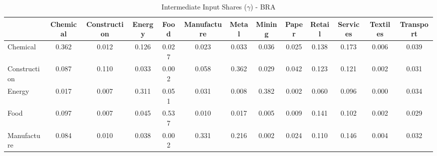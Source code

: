 \begin{table}[htbp]
\centering
\caption{Intermediate Input Shares ($\gamma$) - BRA} 
\label{tab:gamma_BRA}
\begin{tabular}{lcccccccccccc}
  \hline
 & Chemical & Construction & Energy & Food & Manufacture & Metal & Mining & Paper & Retail & Services & Textiles & Transport \\ 
  \hline
Chemical & \textcolor[RGB]{11,7,244}{0.362} & \textcolor[RGB]{189,123,66}{0.012} & \textcolor[RGB]{42,27,212}{0.126} & \textcolor[RGB]{161,104,94}{0.027} & \textcolor[RGB]{172,111,83}{0.023} & \textcolor[RGB]{147,95,108}{0.033} & \textcolor[RGB]{138,89,117}{0.036} & \textcolor[RGB]{165,107,90}{0.025} & \textcolor[RGB]{37,24,218}{0.138} & \textcolor[RGB]{25,16,230}{0.173} & \textcolor[RGB]{221,143,34}{0.006} & \textcolor[RGB]{131,85,124}{0.039} \\ 
  Construction & \textcolor[RGB]{87,56,168}{0.087} & \textcolor[RGB]{57,37,198}{0.110} & \textcolor[RGB]{149,96,106}{0.033} & \textcolor[RGB]{237,154,18}{0.002} & \textcolor[RGB]{113,73,142}{0.058} & \textcolor[RGB]{12,8,243}{0.362} & \textcolor[RGB]{158,102,97}{0.029} & \textcolor[RGB]{128,82,128}{0.042} & \textcolor[RGB]{46,30,209}{0.123} & \textcolor[RGB]{50,32,205}{0.121} & \textcolor[RGB]{241,156,14}{0.002} & \textcolor[RGB]{154,100,101}{0.031} \\ 
  Energy & \textcolor[RGB]{179,116,76}{0.017} & \textcolor[RGB]{204,132,51}{0.007} & \textcolor[RGB]{18,11,237}{0.311} & \textcolor[RGB]{120,78,135}{0.051} & \textcolor[RGB]{152,99,103}{0.031} & \textcolor[RGB]{202,131,53}{0.008} & \textcolor[RGB]{9,6,246}{0.382} & \textcolor[RGB]{243,157,12}{0.002} & \textcolor[RGB]{110,71,145}{0.060} & \textcolor[RGB]{80,52,175}{0.096} & \textcolor[RGB]{253,164,2}{0.000} & \textcolor[RGB]{140,91,115}{0.034} \\ 
  Food & \textcolor[RGB]{78,50,177}{0.097} & \textcolor[RGB]{211,136,44}{0.007} & \textcolor[RGB]{122,79,133}{0.045} & \textcolor[RGB]{0,0,255}{0.537} & \textcolor[RGB]{197,127,58}{0.010} & \textcolor[RGB]{177,115,78}{0.017} & \textcolor[RGB]{223,144,32}{0.005} & \textcolor[RGB]{198,128,57}{0.009} & \textcolor[RGB]{35,23,220}{0.141} & \textcolor[RGB]{71,46,184}{0.102} & \textcolor[RGB]{234,151,21}{0.002} & \textcolor[RGB]{156,101,99}{0.029} \\ 
  Manufacture & \textcolor[RGB]{90,58,165}{0.084} & \textcolor[RGB]{193,125,62}{0.010} & \textcolor[RGB]{136,88,119}{0.038} & \textcolor[RGB]{239,155,16}{0.002} & \textcolor[RGB]{16,10,239}{0.331} & \textcolor[RGB]{23,15,232}{0.216} & \textcolor[RGB]{236,152,19}{0.002} & \textcolor[RGB]{168,109,87}{0.024} & \textcolor[RGB]{58,38,197}{0.110} & \textcolor[RGB]{34,22,221}{0.146} & \textcolor[RGB]{227,147,28}{0.004} & \textcolor[RGB]{151,97,104}{0.032} \\ 

\end{tabular}
\end{table}
